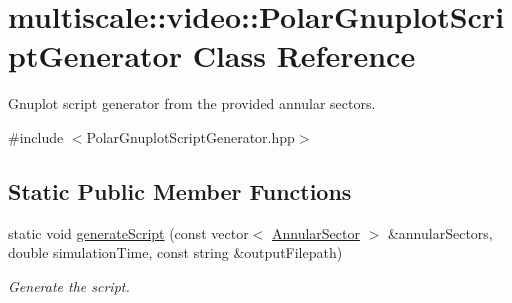 \hypertarget{classmultiscale_1_1video_1_1PolarGnuplotScriptGenerator}{\section{multiscale\-:\-:video\-:\-:\-Polar\-Gnuplot\-Script\-Generator \-Class \-Reference}
\label{classmultiscale_1_1video_1_1PolarGnuplotScriptGenerator}
}


\-Gnuplot script generator from the provided annular sectors.  




{\ttfamily \#include $<$\-Polar\-Gnuplot\-Script\-Generator.\-hpp$>$}

\subsection*{\-Static \-Public \-Member \-Functions}
\begin{DoxyCompactItemize}
\item 
static void \hyperlink{classmultiscale_1_1video_1_1PolarGnuplotScriptGenerator_a9e60fa7dd9c47dc89cdce30a39175a6e}{generate\-Script} (const vector$<$ \hyperlink{classmultiscale_1_1video_1_1AnnularSector}{\-Annular\-Sector} $>$ \&annular\-Sectors, double simulation\-Time, const string \&output\-Filepath)
\begin{DoxyCompactList}\small\item\em \-Generate the script. \end{DoxyCompactList}\end{DoxyCompactItemize}
